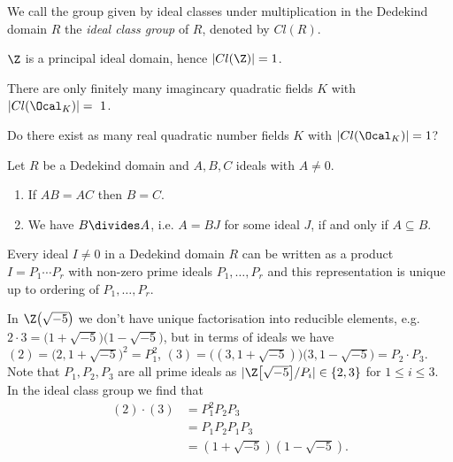 \begin{defn*}
	We call the group given by ideal classes under multiplication in the Dedekind domain \( R \) the \emph{ideal class group} of \( R \), denoted by \( Cl(R) \).
\end{defn*}

\begin{exmp*}
	\( \Z \) is a principal ideal domain, hence \( |Cl(\Z)| = 1 \).
\end{exmp*}

\begin{rem*}
	There are only finitely many imagincary quadratic fields \( K \) with \( |Cl(\Ocal_K)| =~1 \).
\end{rem*}

\begin{frage*}[Gauss]
	Do there exist as many real quadratic number fields \( K \) with \( |Cl(\Ocal_K)| = 1 \)?
\end{frage*}

\begin{cor}
	Let \( R \) be a Dedekind domain and \( A,B,C \) ideals with \( A \neq 0 \).
	\begin{enumerate}
		\item If \( AB = AC \) then \( B=C \).
		\item We have \( B \divides A \), i.e. \( A = BJ \) for some ideal \( J \), if and only if \( A \subseteq B \).
	\end{enumerate}
\end{cor}

\begin{thmn}
	Every ideal \( I \neq 0 \) in a Dedekind domain \( R \) can be written as a product \( I = P_1 \dotsm P_r \) with non-zero prime ideals \( P_1, \dotsc, P_r \) and this representation is unique up to ordering of \( P_1, \dotsc, P_r \).
\end{thmn}

\begin{exmp*}
	In \( \Z\big(\sqrt{-5}\big) \) we don't have unique factorisation into reducible elements, e.g. \( 2 \cdot 3 = \big(1+\sqrt{-5}\big) \big(1 - \sqrt{-5}\big) \), but in terms of ideals we have \( (2) = \big(2, 1+\sqrt{-5}\big)^2 = P_1^2 \), \( (3) = \big((3, 1 + \sqrt{-5})\big) \big(3, 1 - \sqrt{-5}\big) = P_2 \cdot P_3 \). 
	Note that \( P_1, P_2, P_3 \) are all prime ideals as \( |\Z\big[\sqrt{-5}\big]/P_i| \in \{2,3\}  \) for \( 1 \leq i \leq 3 \). In the ideal class group we find that
	\begin{align*}
		(2)\cdot (3) &= P_1^2 P_2 P_3\\
		&= P_1 P_2 P_1 P_3\\
		&= (1 + \sqrt{-5}) (1 - \sqrt{-5}).
	\end{align*}
\end{exmp*}

